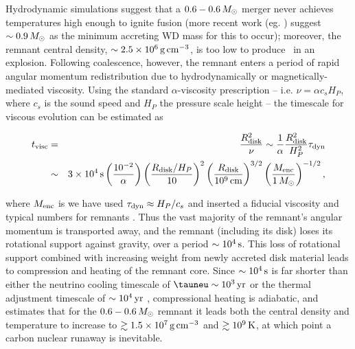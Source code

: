 
Hydrodynamic simulations \citep{loreig09} suggest that a $0.6-0.6\,\Msun$ merger never achieves temperatures high enough to ignite fusion (more recent work (eg. \citep{pakm+11, dan+12}) suggest $\sim0.9\,\Msun$ as the minimum accreting WD mass for this to occur); moreover, the remnant central density, $\sim2.5\times10^6\,\gcc$, is too low to produce \Ni\ in an explosion.  Following coalescence, however, the remnant enters a period of rapid angular momentum redistribution due to hydrodynamically or magnetically-mediated viscosity.  Using the standard $\alpha$-viscosity prescription \cite{shaks73} -- i.e. $\nu = \alpha c_s H_P$, where $c_s$ is the sound speed and $H_P$ the pressure scale height -- the timescale for viscous evolution can be estimated as

\begin{eqnarray}
t_\mrm{visc} &=& \frac{R_\mrm{disk}^2}{\nu} \sim \frac{1}{\alpha}\frac{R_\mrm{disk}^2}{H_P^2}\taudyn \nonumber \\
			&\sim& 3\times10^4\,\mrm{s}\left(\frac{10^{-2}}{\alpha}\right)\left(\frac{R_\mrm{disk}/H_P}{10}\right)^2\left(\frac{R_\mrm{disk}}{10^9\,\mrm{cm}}\right)^{3/2}\left(\frac{M_\mrm{enc}}{1\,\Msun}\right)^{-1/2},
\end{eqnarray}

\noindent where $M_\mathrm{enc}$ is we have used $\taudyn \approx H_P/c_s$ and inserted a fiducial viscosity and typical numbers for remnants \citep{shen+12}.  Thus the vast majority of the remnant's angular momentum is transported away, and the remnant (including its disk) loses its rotational support against gravity, over a period $\sim10^4\,\mathrm{s}$.  This loss of rotational support combined with increasing weight from newly accreted disk material leads to compression and heating of the remnant core.  Since $\sim10^4\,\mathrm{s}$ is far shorter than either the neutrino cooling timescale of $\tauneu \sim 10^3\,\mrm{yr}$ or the thermal adjustment timescale of $\sim10^4\,\mathrm{yr}$ \citep{shen+12}, compressional heating is adiabatic, and \citeal{vkercj10} estimates that for the $0.6-0.6\,\Msun$ remnant it leads both the central density and temperature to increase to $\gtrsim1.5\times10^7\,\gcc$ and $\gtrsim10^9\,\mathrm{K}$, at which point a carbon nuclear runaway is inevitable.

